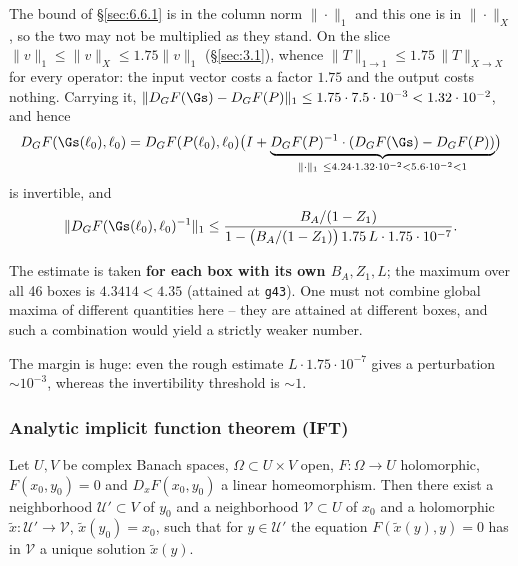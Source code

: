 The bound of \S\ref{sec:6.6.1} is in the column norm $\|\cdot\|_1$ and this one is in $\|\cdot\|_X$, so the two may not be multiplied as they stand. On the slice $\|v\|_1\le\|v\|_X\le1.75\|v\|_1$ (\S\ref{sec:3.1}), whence $\|T\|_{1\to1}\le1.75\,\|T\|_{X\to X}$ for every operator: the input vector costs a factor $1.75$ and the output costs nothing. Carrying it,
$\|D_GF(\Gs)-D_GF(P)\|_1\le1.75\cdot7.5\cdot10^{-3}<1.32\cdot10^{-2}$, and hence
\[
D_GF(\Gs(\ell_0),\ell_0)
=D_GF(P(\ell_0),\ell_0)\bigl(I+\underbrace{D_GF(P)^{-1}\cdot(D_GF(\Gs)-D_GF(P))}_{\|\cdot\|_1\ \le4.24\cdot1.32\cdot10^{-2}<5.6\cdot10^{-2}<1}\bigr)
\]
is invertible, and
\[
\|D_GF(\Gs(\ell_0),\ell_0)^{-1}\|_1
\le\frac{B_A/(1-Z_1)}{1-\bigl(B_A/(1-Z_1)\bigr)\,1.75\,L\cdot1.75\cdot10^{-7}}.
\]

The estimate is taken \textbf{for each box with its own \boldmath$B_A,Z_1,L$}; the maximum over all 46 boxes is $4.3414<4.35$ (attained at \texttt{g43}). One must not combine global maxima of different quantities here -- they are attained at different boxes, and such a combination would yield a strictly weaker number.

The margin is huge: even the rough estimate $L\cdot1.75\cdot10^{-7}$ gives a perturbation $\sim10^{-3}$, whereas the invertibility threshold is $\sim1$.

\subsubsection{Analytic implicit function theorem (IFT)}
\label{sec:6.6.3}

\begin{proposition}
Let $U,V$ be complex Banach spaces, $\Omega\subset U\times V$ open, $F:\Omega\to U$ holomorphic, $F(x_0,y_0)=0$ and $D_xF(x_0,y_0)$ a linear homeomorphism. Then there exist a neighborhood $\mathcal U'\subset V$ of $y_0$ and a neighborhood $\mathcal V\subset U$ of $x_0$ and a holomorphic $\tilde x:\mathcal U'\to\mathcal V$, $\tilde x(y_0)=x_0$, such that for $y\in\mathcal U'$ the equation $F(\tilde x(y),y)=0$ has in $\mathcal V$ a unique solution $\tilde x(y)$.
\end{proposition}

